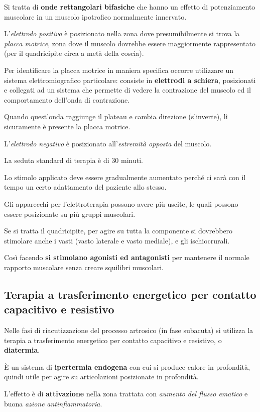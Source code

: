 Si tratta di \textbf{onde rettangolari bifasiche} che hanno un effetto
di potenziamento muscolare in un muscolo ipotrofico normalmente
innervato.


L'\emph{elettrodo positivo} è posizionato nella zona dove
presumibilmente si trova la \emph{placca motrice}, zona dove il muscolo
dovrebbe essere maggiormente rappresentato (per il quadricipite circa a
metà della coscia).

Per identificare la placca motrice in maniera specifica occorre
utilizzare un sistema elettromiografico particolare: consiste in
\textbf{elettrodi a schiera}, posizionati e collegati ad un sistema che
permette di vedere la contrazione del muscolo ed il comportamento
dell'onda di contrazione.

Quando quest'onda raggiunge il plateau e cambia direzione (s'inverte),
lì sicuramente è presente la placca motrice.

L'\emph{elettrodo negativo} è posizionato all'\emph{estremità opposta}
del muscolo.

La seduta standard di terapia è di 30 minuti.

Lo stimolo applicato deve essere gradualmente aumentato perché ci sarà
con il tempo un certo adattamento del paziente allo stesso.

Gli apparecchi per l'elettroterapia possono avere più uscite, le quali
possono essere posizionate su più gruppi muscolari.

Se si tratta il quadricipite, per agire su tutta la componente si
dovrebbero stimolare anche i vasti (vasto laterale e vasto mediale), e
gli ischiocrurali.


Così facendo \textbf{si stimolano agonisti ed antagonisti} per mantenere
il normale rapporto muscolare senza creare squilibri muscolari.


\subsection{Terapia a trasferimento energetico per contatto capacitivo e resistivo}

Nelle fasi di riacutizzazione del processo artrosico (in fase subacuta)
si utilizza la terapia a trasferimento energetico per contatto
capacitivo e resistivo, o \textbf{diatermia}.

È un sistema di \textbf{ipertermia endogena} con cui si produce calore
in profondità, quindi utile per agire su articolazioni posizionate in
profondità.

L'effetto è di \textbf{attivazione} nella zona trattata con
\emph{aumento del flusso ematico} e buona \emph{azione}
\emph{antinfiammatoria}.


